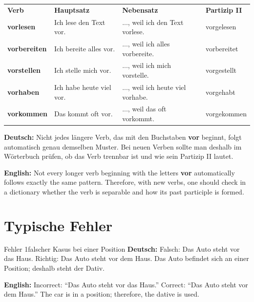 \documentclass[a4paper,11pt]{article}
\newcommand{\GermanText}[1]{\textbf{Deutsch: }#1\par}
\newcommand{\EnglishText}[1]{{\small\color{SoftGray}\textbf{English: }#1\par}}
\begin{document}
        \begin{longtable}{>{\bfseries}p{3.1cm}p{4.5cm}p{4.5cm}p{3.1cm}}
            \rowcolor{HeaderBlueDark}
            \color{white}\textbf{Verb} &
            \color{white}\textbf{Hauptsatz} &
            \color{white}\textbf{Nebensatz} &
            \color{white}\textbf{Partizip II} \\
            vorlesen & Ich lese den Text vor. & ..., weil ich den Text vorlese. & vorgelesen \\
            vorbereiten & Ich bereite alles vor. & ..., weil ich alles vorbereite. & vorbereitet \\
            vorstellen & Ich stelle mich vor. & ..., weil ich mich vorstelle. & vorgestellt \\
            vorhaben & Ich habe heute viel vor. & ..., weil ich heute viel vorhabe. & vorgehabt \\
            vorkommen & Das kommt oft vor. & ..., weil das oft vorkommt. & vorgekommen \\
        \end{longtable}

        \begin{warningbox}
            \GermanText{Nicht jedes längere Verb, das mit den Buchstaben \textbf{vor} beginnt, folgt automatisch genau demselben Muster. Bei neuen Verben sollte man deshalb im Wörterbuch prüfen, ob das Verb trennbar ist und wie sein Partizip II lautet.}
            \EnglishText{Not every longer verb beginning with the letters \textbf{vor} automatically follows exactly the same pattern. Therefore, with new verbs, one should check in a dictionary whether the verb is separable and how its past participle is formed.}
        \end{warningbox}


    \section{Typische Fehler}

        \begin{grammarentry}{Fehler 1}{falscher Kasus bei einer Position}
            \GermanText{Falsch: \glqq Das Auto steht vor das Haus.\grqq{} Richtig: \glqq Das Auto steht vor dem Haus.\grqq{} Das Auto befindet sich an einer Position; deshalb steht der Dativ.}
            \EnglishText{Incorrect: ``Das Auto steht vor das Haus.'' Correct: ``Das Auto steht vor dem Haus.'' The car is in a position; therefore, the dative is used.}
        \end{grammarentry}
\end{document}
